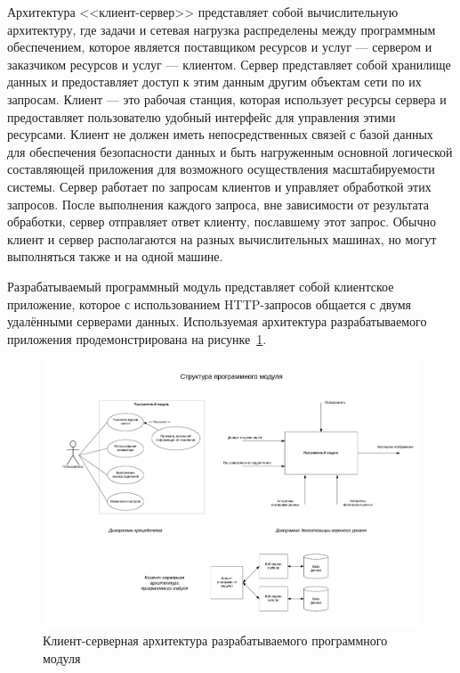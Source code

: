Архитектура <<клиент-сервер>> представляет собой вычислительную архитектуру,
где задачи и сетевая нагрузка распределены между программным обеспечением,
которое является поставщиком ресурсов и услуг --- сервером и заказчиком ресурсов
и услуг --- клиентом.
Сервер представляет собой хранилище данных и предоставляет доступ к этим
данным другим объектам сети по их запросам.
Клиент --- это рабочая станция, которая использует ресурсы сервера и
предоставляет пользователю удобный интерфейс для управления этими ресурсами.
Клиент не должен иметь непосредственных связей с базой данных для
обеспечения безопасности данных и быть нагруженным основной логической
составляющей приложения для возможного осуществления масштабируемости системы.
Сервер работает по запросам клиентов и управляет обработкой этих запросов.
После выполнения каждого запроса, вне зависимости от результата обработки,
сервер отправляет ответ клиенту, пославшему этот запрос.
Обычно клиент и сервер располагаются на разных вычислительных машинах,
но могут выполняться также и на одной машине.

Разрабатываемый программный модуль представляет собой клиентское приложение,
которое с использованием HTTP-запросов общается с двумя удалёнными серверами данных.
Используемая архитектура разрабатываемого приложения продемонстрирована
на рисунке~\ref{fig:client_servers_schema}.
\begin{figure}[h!]
  \centering
  \includegraphics[width=130mm]{fig/client_servers_schema}
  \caption{Клиент-серверная архитектура разрабатываемого программного модуля}
  \label{fig:client_servers_schema}
\end{figure}




